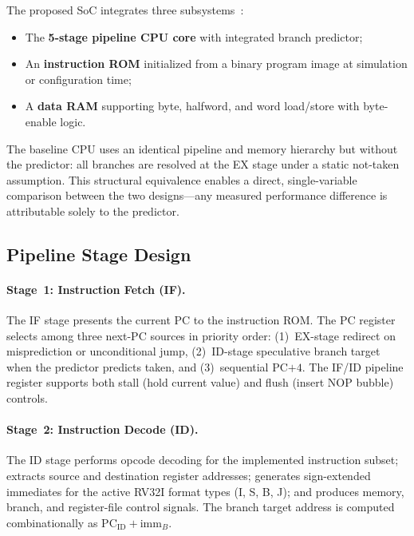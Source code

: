 \documentclass[12pt,a4paper]{article}
\begin{document}
The proposed SoC integrates three
subsystems~\cite{waterman2016riscv,palnitkar2003verilog}:

\begin{itemize}
  \item The \textbf{5-stage pipeline CPU core} with integrated branch predictor;
  \item An \textbf{instruction ROM} initialized from a binary program image at
    simulation or configuration time;
  \item A \textbf{data RAM} supporting byte, halfword, and word load/store with
    byte-enable logic.
\end{itemize}

The baseline CPU uses an identical pipeline and memory hierarchy but without the
predictor: all branches are resolved at the EX stage under a static not-taken
assumption. This structural equivalence enables a direct, single-variable
comparison between the two designs---any measured performance difference is
attributable solely to the predictor.

\subsection{Pipeline Stage Design}
\label{sec:modules}

\paragraph{Stage~1: Instruction Fetch (IF).}
The IF stage presents the current PC to the instruction ROM. The PC register
selects among three next-PC sources in priority order: (1)~EX-stage redirect on
misprediction or unconditional jump, (2)~ID-stage speculative branch target when
the predictor predicts taken, and (3)~sequential PC$+4$. The IF/ID pipeline
register supports both stall (hold current value) and flush (insert NOP bubble)
controls.

\paragraph{Stage~2: Instruction Decode (ID).}
The ID stage performs opcode decoding for the implemented instruction subset;
extracts source and destination register addresses; generates sign-extended
immediates for the active RV32I format types (I, S, B, J); and produces memory,
branch, and register-file control signals.
The branch target address is computed combinationally as
$\mathrm{PC}_\mathrm{ID} + \mathrm{imm}_{B}$.
\end{document}
